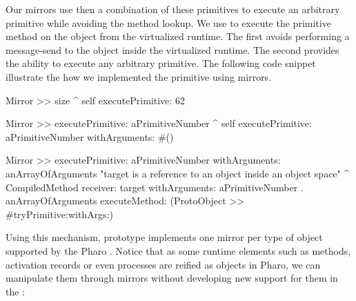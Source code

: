 Our mirrors use then a combination of these primitives to execute an arbitrary primitive while avoiding the method lookup. We use  to execute the primitive method  on the object from the virtualized runtime. The first avoids performing a message-send to the object inside the virtualized runtime. The second provides the ability to execute any arbitrary primitive. The following code snippet illustrate the how we implemented the  primitive using mirrors.

\begin{code}
Mirror >> size
    ^ self executePrimitive: 62

Mirror >> executePrimitive: aPrimitiveNumber 
    ^ self executePrimitive: aPrimitiveNumber withArguments: #()
    
Mirror >> executePrimitive: aPrimitiveNumber withArguments: anArrayOfArguments
    "target is a reference to an object inside an object space"
    ^ CompiledMethod
           receiver: target
           withArguments: { aPrimitiveNumber . anArrayOfArguments }
           executeMethod: (ProtoObject >> #tryPrimitive:withArgs:)
\end{code}

Using this mechanism, \Vtt prototype implements one mirror per type of object supported by the Pharo \VM. Notice that as some runtime elements such as methods, activation records or even processes are reified as objects in Pharo, we can manipulate them through mirrors without developing new support for them in the \VM:


